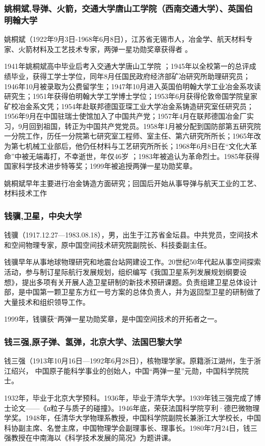 \documentclass[UTF8]{ctexart}
\begin{document}
    \subsubsection{姚桐斌,导弹、火箭，交通大学唐山工学院（西南交通大学）、英国伯明翰大学}
姚桐斌（1922年9月3日-1968年6月8日），江苏省无锡市人，冶金学、航天材料专家、火箭材料及工艺技术专家，两弹一星功勋奖章获得者 。

1941年姚桐斌高中毕业后考入交通大学唐山工学院 ；1945年以全校第一的总评成绩毕业，获得工学士学位，同年8月任国民政府经济部矿冶研究所助理研究员；1946年10月被录取为公费留学生；1947年10月进入英国伯明翰大学工业冶金系攻读研究生；1951年获得伯明翰大学工学博士学位；1953年6月获得伦敦帝国学院皇家矿校冶金系文凭；1954年赴联邦德国亚琛工业大学冶金系铸造研究室任研究员；1956年9月在中国驻瑞士使馆加入了中国共产党；1957年4月在联邦德国冶金厂实习，9月回到祖国，转正为中国共产党党员。1958年1月被分配到国防部第五研究院一分院工作，历任一分院第七研究室工程师、室主任、第六研究所所长；1965年改为第七机械工业部后，他仍任材料与工艺研究所所长；1968年6月8日在“文化大革命”中被无端毒打，不幸逝世，年仅46岁 ；1983年被追认为革命烈士。1985年获得国家科学技术进步特等奖；1999年被追授两弹一星功勋奖章。

姚桐斌早年主要进行冶金铸造方面研究；回国后开始从事导弹与航天工业的工艺、材料技术工作
    \subsubsection{钱骥,卫星，中央大学}
钱骥（1917.12.27—1983.08.18），男，出生于江苏省金坛县。中共党员，空间技术和空间物理专家，原中国空间技术研究院副院长、科技委副主任。

钱骥早年从事地球物理研究和地震台站网建设工作。20世纪50年代起从事空间探索活动，参与制订星际航行发展规划，组织编写《我国卫星系列发展规划纲要设想》，提出多项有关开展人造卫星研制的新技术预研课题。负责组建卫星总体设计部，是中国第一颗卫星东方红一号方案的总体负责人，并为返回型卫星的研制做了大量技术和组织领导工作。

1999年，钱骥获“两弹一星功勋奖章，是中国空间技术的开拓者之一。

    \subsubsection{钱三强,原子弹、氢弹，北京大学、法国巴黎大学}
钱三强（1913年10月16日—1992年6月28日），核物理学家。原籍浙江湖州，生于浙江绍兴， 中国原子能科学事业的创始人，中国“两弹一星”元勋，中国科学院院士。

1932年，毕业于北京大学预科。1936年，毕业于清华大学。1939年钱三强完成了博士论文——《α粒子与质子的碰撞》。1946年底，荣获法国科学院亨利·德巴微物理学奖。1948年，任清华大学物理系教授，中国科学院副院长兼浙江大学校长，中国科协副主席、名誉主席，中国物理学会副理事长、理事长。1980年7月24日，钱三强教授在中南海以《科学技术发展的简况》为题讲课。 
\end{document}
